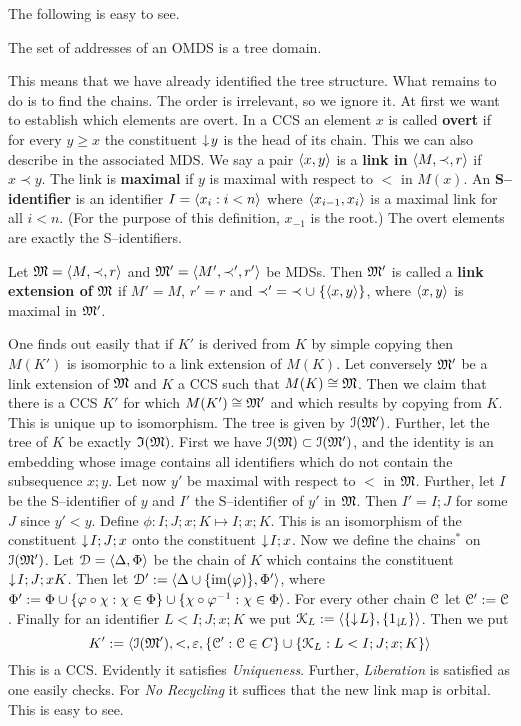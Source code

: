 The following is easy to see.
\begin{prop}
The set of addresses of an OMDS is a tree domain.
\end{prop}
This means that we have already identified the tree structure.
What remains to do is to find the chains. The order is irrelevant, so
we ignore it. At first we want to establish which elements are
overt. In a CCS an element $x$ is called \textbf{overt} if for
every $y \geq x$ the constituent ${\downarrow\! y}$ is the head of its
chain. This we can also describe in the associated MDS. We say
a pair $\langle x,y\rangle$ is a \textbf{link in} $\langle M, \prec, r\rangle$
if $x \prec y$. The link is \textbf{maximal} if $y$ is maximal with
respect to $<$ in $M(x)$. An \textbf{S--identifier} is an identifier
$I = \langle x_i : i < n\rangle$ where $\langle x_{i-1}, x_{i}\rangle$
is a maximal link for all $i < n$. (For the purpose of this 
definition, $x_{-1}$ is the root.) The overt elements are exactly 
the S--identifiers.
\begin{defn}
Let $\mathfrak{M} = \langle M, \prec, r\rangle$ and $\mathfrak{M}' = \langle M', \prec', r'\rangle$
be MDSs. Then $\mathfrak{M}'$ is called a  \textbf{link extension of} $\mathfrak{M}$
if $M' = M$, $r' = r$ and $\prec'\; = \;\prec \cup \;\{\langle x,y\rangle\}$,
where $\langle x,y\rangle$ is maximal in $\mathfrak{M}'$.
\end{defn}
One finds out easily that if $K'$ is derived from $K$ by simple
copying then $M(K')$ is isomorphic to a link extension of $M(K)$.
Let conversely $\mathfrak{M}'$ be a link extension of $\mathfrak{M}$ and $K$ a CCS
such that $M(K) \cong \mathfrak{M}$. Then we claim that there is a CCS $K'$
for which $M(K') \cong \mathfrak{M}'$ and which results by copying from $K$.
This is unique up to isomorphism. The tree is given by $\mathcal{I}(\mathfrak{M}')$.
Further, let the tree of $K$ be exactly $\mathfrak{I}(\mathfrak{M})$. First we have
$\mathcal{I}(\mathfrak{M}) \subset \mathcal{I}(\mathfrak{M}')$, and the identity is an embedding
whose image contains all identifiers which do not contain the
subsequence $x;y$. Let now $y'$ be maximal with respect to $<$
in $\mathfrak{M}$. Further, let $I$ be the S--identifier of $y$ and $I'$
the S--identifier of $y'$ in $\mathfrak{M}$. Then $I' = I;J$ for some $J$
since $y' < y$. Define $\phi : I;J;x;K \mapsto I;x;K$. This is an
isomorphism of the constituent ${\downarrow\! I;J;x}$ onto the constituent
${\downarrow\! I;x}$. Now we define the chains$^{\ast}$ on $\mathcal{I}(\mathfrak{M}')$. Let
$\mathcal{D} = \langle \Delta, \Phi\rangle$ be the chain of $K$ which contains
the constituent ${\downarrow\! I;J;xK}$. Then let
$\mathcal{D}' := \langle \Delta \cup \{\operatorname{im}(\varphi)\},
\Phi'\rangle$, where $\Phi' := \Phi \cup \{\varphi \circ \chi :
    \chi \in \Phi\} \cup \{\chi \circ \varphi^{-1} :
    \chi \in \Phi\rangle$.
For every other chain $\mathcal{C}$ let $\mathcal{C}' := \mathcal{C}$. Finally
for an identifier $L < I;J;x;K$ we put $\CK_L := \auf \{\low{L}\}, %
\{1_{\low{L}}\}\zu$. Then we put
\begin{equation}
K' := \langle \mathcal{I}(\mathfrak{M}'), <, \varepsilon, \{\mathcal{C}' : \mathcal{C} \in C\}
    \cup \{\mathcal{K}_L : L < I;J;x;K\}\rangle 
\end{equation}
This is a CCS. Evidently it satisfies {\sl Uniqueness}. Further,
{\sl Liberation\/} is satisfied as one easily checks. For {\sl No
Recycling\/} it suffices that the new link map is orbital. 
This is easy to see. 

